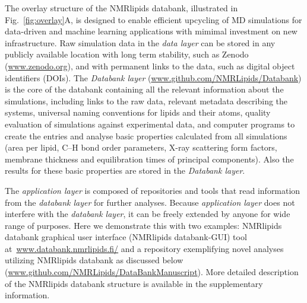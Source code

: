 \documentclass[fleqn,10pt]{wlscirep}
\begin{document}
The overlay structure of the NMRlipids databank, illustrated in Fig.~\ref{fig:overlay}A, is designed to enable efficient upcycling of MD simulations for data-driven and machine learning applications with mimimal investment on new infrastructure. Raw simulation data in the {\it data layer} can be stored in any publicly available location with long term stability, such as Zenodo (\url{www.zenodo.org}), and with permanent links to the data, such as digital object identifiers (DOIs). 
The {\it Databank layer} (\url{www.github.com/NMRLipids/Databank}) is the core of the databank containing all the relevant information about the simulations, including links to the raw data, relevant metadata describing the systems, universal naming conventions for lipids and their atoms, quality evaluation of simulations against experimental data, and computer programs to create the entries and analyse basic properties calculated from all simulations (area per lipid, C--H bond order parameters, X-ray scattering form factors, membrane thickness and equilibration times of principal components). Also the results for these basic properties are stored in the {\it Databank layer}. 

The {\it application layer} is composed of repositories and tools that read information from the {\it databank layer} for further analyses. Because {\it application layer} does not interfere with the {\it databank layer}, it can be freely extended by anyone for wide range of purposes. Here we demonstrate this with two examples: NMRlipids databank graphical user interface (NMRlipids databank-GUI) tool at~\url{www.databank.nmrlipids.fi/} and a repository exemplifying novel analyses utilizing NMRlipids databank as discussed below (\url{www.github.com/NMRLipids/DataBankManuscript}). More detailed description of the NMRlipids databank structure is available in the supplementary information. 
\end{document}

